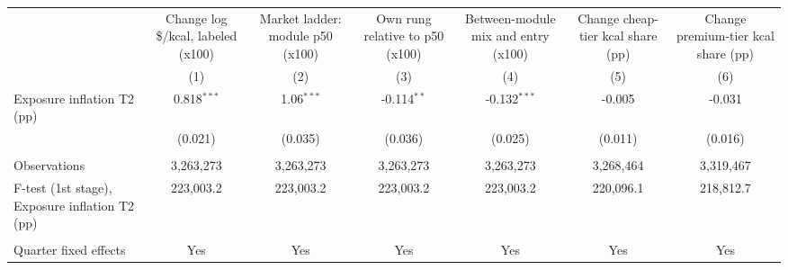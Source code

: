 \begingroup
\centering
\begin{tabular*}{\textwidth}{@{\extracolsep{\fill}}lcccccc}
   \toprule
                                                  & Change log \$/kcal, labeled (x100)  & Market ladder: module p50 (x100) & Own rung relative to p50 (x100) & Between-module mix and entry (x100) & Change cheap-tier kcal share (pp) & Change premium-tier kcal share (pp)\\  
                                                  & (1)                                  & (2)                              & (3)                             & (4)                                 & (5)                               & (6)\\  
   \midrule 
   Exposure inflation T2 (pp)                     & 0.818$^{***}$                        & 1.06$^{***}$                     & -0.114$^{**}$                   & -0.132$^{***}$                      & -0.005                            & -0.031\\   
                                                  & (0.021)                              & (0.035)                          & (0.036)                         & (0.025)                             & (0.011)                           & (0.016)\\   
    \\
   Observations                                   & 3,263,273                            & 3,263,273                        & 3,263,273                       & 3,263,273                           & 3,268,464                         & 3,319,467\\  
   F-test (1st stage), Exposure inflation T2 (pp) & 223,003.2                            & 223,003.2                        & 223,003.2                       & 223,003.2                           & 220,096.1                         & 218,812.7\\  
    \\
   Quarter fixed effects                          & Yes                                  & Yes                              & Yes                             & Yes                                 & Yes                               & Yes\\  
   \bottomrule
\end{tabular*}
\par\endgroup
